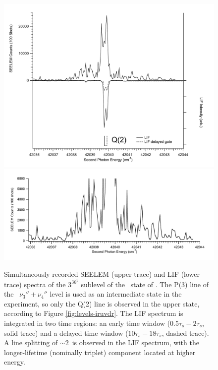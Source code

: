 \documentclass[12pt]{mitthesis}
\begin{document}
\begin{figure}
  \caption{Simultaneously recorded SEELEM (upper trace) and LIF (lower
    trace) spectra of the $3^36^1$  sublevel of the \astate\
    state of .  The P(3) line of the \xstate\ $\nu_3'' +
    \nu_4''$ level is used as an intermediate state in the experiment,
    so only the Q(2) line is observed in the upper state, according to
    Figure \ref{fig:levels-iruvdr}.  The LIF spectrum is integrated in
    two time regions: an early time window ($0.5\tau_s-2\tau_s$, solid
    trace) and a delayed time window ($10\tau_s-18\tau_s$, dashed
    trace).  A line splitting of $\sim 2$\rcm\ is observed in the LIF
    spectrum, with the longer-lifetime (nominally triplet) component
    located at higher energy.}
  \label{fig:3361-q2}
  \centering
  \includegraphics[width=6in]{spectrum-3361-q2-split.pdf}
  \includegraphics[width=6in]{spectrum-3361-q2-zoom.pdf}
\end{figure}
\end{document}
